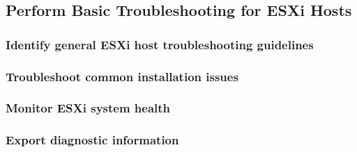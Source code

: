 \subsection{Perform Basic Troubleshooting for ESXi Hosts}

\subsubsection{Identify general ESXi host troubleshooting guidelines}

\subsubsection{Troubleshoot common installation issues}

\subsubsection{Monitor ESXi system health}

\subsubsection{Export diagnostic information}
